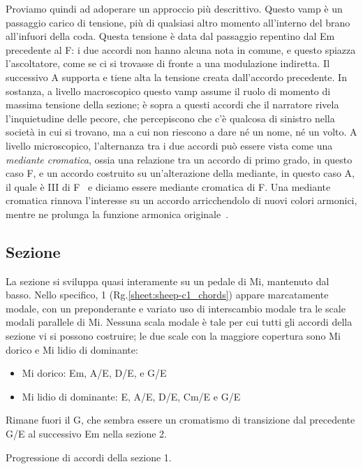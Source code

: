 \documentclass[class=book, crop=false, oneside, 12pt]{standalone}
\begin{document}
    Proviamo quindi ad adoperare un approccio più descrittivo. Questo vamp è un passaggio carico di tensione, più di qualsiasi altro momento all'interno del brano all'infuori della coda. Questa tensione è data dal passaggio repentino dal Em precedente al F\sharp : i due accordi non hanno alcuna nota in comune, e questo spiazza l'ascoltatore, come se ci si trovasse di fronte a una modulazione indiretta. Il successivo A supporta e tiene alta la tensione creata dall'accordo precedente. In sostanza, a livello macroscopico questo vamp assume il ruolo di momento di massima tensione della sezione; è sopra a questi accordi che il narratore rivela l'inquietudine delle pecore, che percepiscono che c'è qualcosa di sinistro nella società in cui si trovano, ma a cui non riescono a dare né un nome, né un volto. A livello microscopico, l'alternanza tra i due accordi può essere vista come una \emph{mediante cromatica}, ossia una relazione tra un accordo di primo grado, in questo caso F\sharp, e un accordo costruito su un'alterazione della mediante,  in questo caso A, il quale è \flat III di F\sharp~ e diciamo essere mediante cromatica di F\sharp. Una mediante cromatica rinnova l'interesse su un accordo arricchendolo di nuovi colori armonici, mentre ne prolunga la funzione armonica originale~\cite[p. 202]{benward2014music}.


    \subsection{Sezione }
    La sezione  si sviluppa quasi interamente su un pedale di Mi, mantenuto dal basso. Nello specifico, 1 (Rg.\ref{sheet:sheep-c1_chords}) appare marcatamente modale, con un preponderante e variato uso di interscambio modale tra le scale modali parallele di Mi. Nessuna scala modale è tale per cui tutti gli accordi della sezione vi si possono costruire; le due scale con la maggiore copertura sono Mi dorico e Mi lidio di dominante:
    \begin{itemize}
        \item Mi dorico: Em, A/E, D/E, e G/E
        \item Mi lidio di dominante: E, A/E, D/E, C\sharp m/E e G/E
    \end{itemize}

    Rimane fuori il G\flat, che sembra essere un cromatismo di transizione dal precedente G/E al successivo Em nella sezione 2.
    
    \begin{sheet}[htb]
        \centering
        \caption[Progressione di accordi della sezione 1.]{Progressione di accordi della sezione 1.}
        \label{sheet:sheep-c1_chords}
    \end{sheet}
\end{document}
